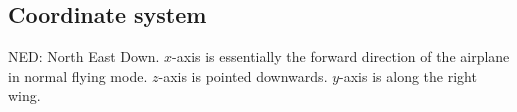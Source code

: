 \subsection{Coordinate system}
NED: North East Down.
$x$-axis is essentially the forward direction of the airplane in normal flying mode.
$z$-axis is pointed downwards.
$y$-axis is along the right wing.